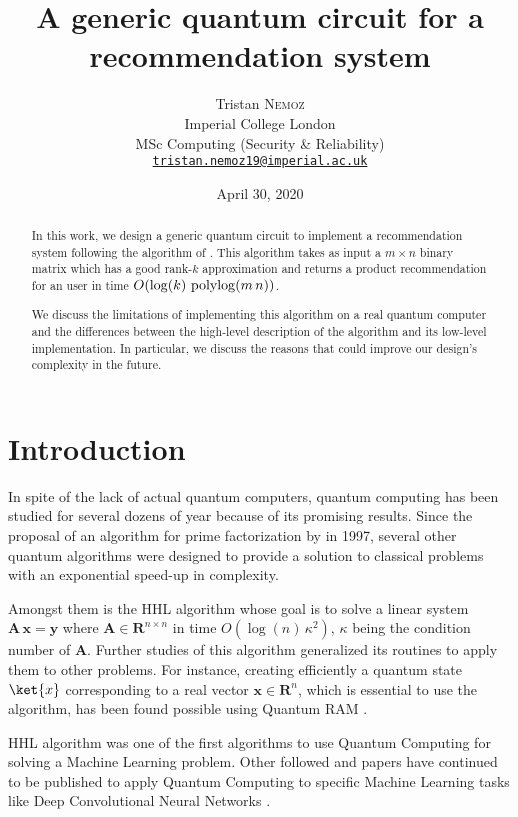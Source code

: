 \documentclass[11pt, a4paper]{article}
\date{April 30, 2020}
\author{Tristan \textsc{Nemoz}\\Imperial College London\\MSc Computing (Security \& Reliability)\\\href{mailto:tristan.nemoz19@imperial.ac.uk}{\texttt{tristan.nemoz19@imperial.ac.uk}}}
\title{A generic quantum circuit for a recommendation system}
\begin{document}
	
	\maketitle
    \begin{abstract}
        In this work, we design a generic quantum circuit to implement a recommendation system following the algorithm of \citeauthor{QRS}. This algorithm takes as input a \(m\times n\) binary matrix which has a good rank-\(k\) approximation and returns a product recommendation for an user in time \(O(\log(k)\,\operatorname{polylog}(m\,n))\).
        
        We discuss the limitations of implementing this algorithm on a real quantum computer and the differences between the high-level description of the algorithm and its low-level implementation. In particular, we discuss the reasons that could improve our design's complexity in the future.
    \end{abstract}
    
    \section{Introduction}
        In spite of the lack of actual quantum computers, quantum computing has been studied for several dozens of year because of its promising results. Since the proposal of an algorithm for prime factorization \cite{Shor} by \citeauthor{Shor} in 1997, several other quantum algorithms were designed to provide a solution to classical problems with an exponential speed-up in complexity.
        
        Amongst them is the HHL algorithm \cite{HHL} whose goal is to solve a linear system \(\mathbf{A}\,\mathbf{x}=\mathbf{y}\) where \(\mathbf{A}\in\mathbf{R}^{n\times n}\) in time \(O\left(\log(n)\,\kappa^2\right)\), \(\kappa\) being the condition number of \(\mathbf{A}\). Further studies of this algorithm generalized its routines to apply them to other problems. For instance, creating efficiently a quantum state \(\ket{x}\) corresponding to a real vector \(\mathbf{x}\in\mathbf{R}^n\), which is essential to use the algorithm, has been found possible using Quantum RAM \cite{Prakash, QRAM, QRAMCircuit}.
        
        HHL algorithm was one of the first algorithms to use Quantum Computing for solving a Machine Learning problem. Other followed and papers have continued to be published to apply Quantum Computing to specific Machine Learning tasks like Deep Convolutional Neural Networks \cite{QCNN}.
        
\end{document}
